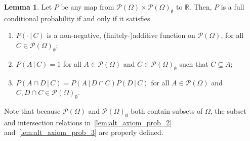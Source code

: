 \documentclass[10pt]{paper}
\theoremstyle{definition}
\newtheorem{lemma}[theorem]{Lemma}
\newcommand{\reals}{\mathbb{R}}
\newcommand{\paths}{\Omega}
\newcommand{\power}{\mathcal{P}(\paths)}
\newcommand{\nonemptypower}{\power_{\emptyset}}
\begin{document}
\begin{lemma}\label{lemma:alt_axiom_prob}
Let $P$ be any map from $\power\times\nonemptypower$ to $\reals$. Then, $P$ is a full conditional probability if and only if it satisfies
\begin{enumerate}[label=P\arabic*:,ref=P\arabic*]
\item $P(\cdot\,\vert\,C)$ is a non-negative, (finitely-)additive function on $\power$, for all $C\in\nonemptypower$;\label{lem:alt_axiom_prob_1}
\item $P(A\,\vert\,C)=1$ for all $A\in\power$ and $C\in\nonemptypower$ such that $C\subseteq A$;\label{lem:alt_axiom_prob_2}
\item $P(A\cap D\,\vert\,C)=P(A\,\vert\,D\cap C)P(D\,\vert\,C)$ for all $A\in\power$ and $C,D\cap C\in\nonemptypower$.\label{lem:alt_axiom_prob_3}
\end{enumerate}
Note that because $\power$ and $\nonemptypower$ both contain subsets of $\Omega$, the subset and intersection relations in~\ref{lem:alt_axiom_prob_2} and~\ref{lem:alt_axiom_prob_3} are properly defined.
\end{lemma}
\end{document}
